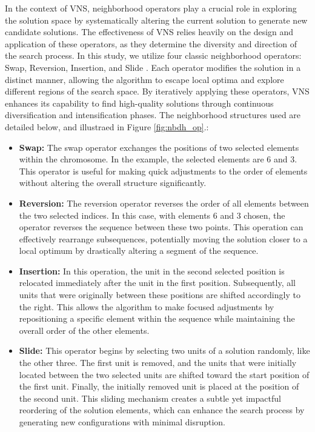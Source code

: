 \documentclass[sn-nature]{sn-jnl}%
\theoremstyle{thmstyleone}%
\theoremstyle{thmstyletwo}%
\theoremstyle{thmstylethree}%
\begin{document}
In the context of VNS, neighborhood operators play a crucial role 
in exploring the solution space by systematically altering the current solution to generate new candidate solutions. 
The effectiveness of VNS relies heavily on the design and application of these operators, as they determine the 
diversity and direction of the search process. In this study, we utilize four classic neighborhood operators: 
Swap, Reversion, Insertion, and Slide \cite{devika2014designing}. Each operator modifies the solution in a distinct manner, allowing the 
algorithm to escape local optima and explore different regions of the search space. By iteratively applying 
these operators, VNS enhances its capability to find high-quality solutions through continuous diversification 
and intensification phases. The neighborhood structures used are detailed below, and illustraed in Figure \ref{fig:nbdh_op}.:

\begin{itemize}
    \item \textbf{Swap:} The swap operator exchanges the positions of two selected elements within the chromosome. 
    In the example, the selected elements are 6 and 3. This operator is useful for making quick adjustments to 
    the order of elements without altering the overall structure significantly.
    \item \textbf{Reversion:} The reversion operator reverses the order of all elements between the two selected indices. In this case, with elements 6 and 3 chosen, 
    the operator reverses the sequence between these two points. This operation can effectively rearrange subsequences, potentially moving the solution 
    closer to a local optimum by drastically altering a segment of the sequence. \cite{vahdani2010scheduling}
    \item \textbf{Insertion:} In this operation, the unit in the second selected position is relocated immediately after the unit in the first position. 
    Subsequently, all units that were originally between these positions are shifted accordingly to the right. This allows the algorithm to make focused 
    adjustments by repositioning a specific element within the sequence while maintaining the overall order of the other elements. \cite{rabiee2012scheduling}
    \item \textbf{Slide:} This operator begins by selecting two units of a solution randomly, like the other three. The first unit is removed, and the units 
    that were initially located between the two selected units are shifted toward the start position of the first unit. Finally, the initially 
    removed unit is placed at the position of the second unit. This sliding mechanism creates a subtle yet impactful reordering of the solution elements, 
    which can enhance the search process by generating new configurations with minimal disruption.
\end{itemize}
\end{document}
